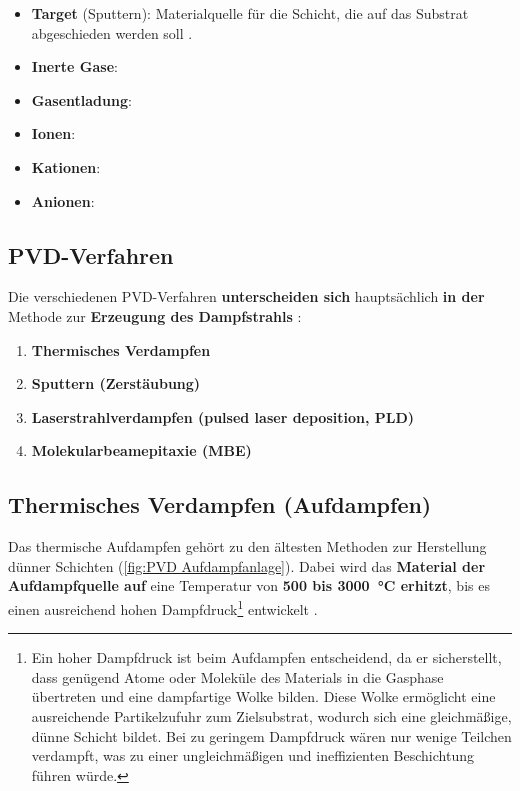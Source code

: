 \documentclass{article} %
\begin{document}
\begin{itemize}
{    Aufdampfanlage} und \autoref{fig:Tiegel und Schiffchen} a).
    \item \textbf{Target} (Sputtern): Materialquelle für die Schicht, die auf das Substrat abgeschieden werden soll \cite{keplinger2024}.
    \item \textbf{Inerte Gase}:
    \item \textbf{Gasentladung}:
    \item \textbf{Ionen}:
    \item \textbf{Kationen}:
    \item \textbf{Anionen}:
\end{itemize}

\vspace{1em}
\subsection{PVD-Verfahren} %
Die verschiedenen PVD-Verfahren \textbf{unterscheiden sich} hauptsächlich \textbf{in der} Methode zur \textbf{Erzeugung des Dampfstrahls} 
\cite{keplinger2024}:
\begin{enumerate}
    \item \textbf{Thermisches Verdampfen}
    \item \textbf{Sputtern (Zerstäubung)}
    \item \textbf{Laserstrahlverdampfen (pulsed laser deposition, PLD)}
    \item \textbf{Molekularbeamepitaxie (MBE)}
\end{enumerate}

\vspace{1em}
\subsection{Thermisches Verdampfen (Aufdampfen)} %
Das thermische Aufdampfen gehört zu den ältesten Methoden zur Herstellung dünner Schichten (\autoref{fig:PVD Aufdampfanlage}). Dabei wird das 
\textbf{Material der Aufdampfquelle auf} eine Temperatur von \textbf{500 bis 3000~°C erhitzt}, bis es einen ausreichend hohen 
Dampfdruck\footnote{Ein hoher Dampfdruck ist beim Aufdampfen entscheidend, da er sicherstellt, dass genügend Atome oder Moleküle des Materials 
in die Gasphase übertreten und eine dampfartige Wolke bilden. Diese Wolke ermöglicht eine ausreichende Partikelzufuhr zum Zielsubstrat, wodurch 
sich eine gleichmäßige, dünne Schicht bildet. Bei zu geringem Dampfdruck wären nur wenige Teilchen verdampft, was zu einer ungleichmäßigen und 
ineffizienten Beschichtung führen würde.} entwickelt \cite{keplinger2024}.
\end{document}
